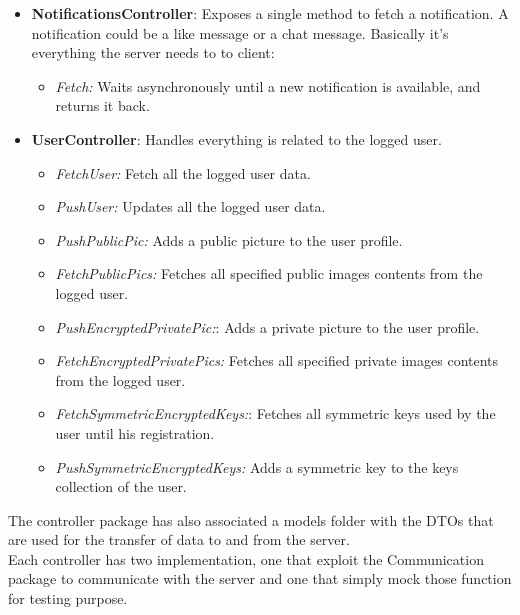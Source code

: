 \documentclass{article}
\begin{document}
\begin{itemize}
\begin{itemize}
	    \end{itemize}
	\item \textbf{NotificationsController}: Exposes a single method to fetch a notification. A notification could be a like message or a chat message. Basically it's everything the server needs to to client:
		\begin{itemize}
				\item \textit{ Fetch:} Waits asynchronously until a new notification is available, and returns it back.
		\end{itemize}
	\item \textbf{UserController}: Handles everything is related to the logged user.
	\begin{itemize}
    	    \item \textit{ FetchUser:} Fetch all the logged user data.
	        \item \textit{ PushUser:} Updates all the logged user data.
	        \item \textit{ PushPublicPic:} Adds a public picture to the user profile.
	        \item \textit{ FetchPublicPics:} Fetches all specified public images contents from the logged user.
	        \item \textit{ PushEncryptedPrivatePic:}: Adds a private picture to the user profile.
	        \item \textit{ FetchEncryptedPrivatePics:} Fetches all specified private images contents from the logged user.
	        \item \textit{ FetchSymmetricEncryptedKeys:}: Fetches all symmetric keys used by the user until his registration.
	        \item \textit{ PushSymmetricEncryptedKeys:} Adds a symmetric key to the keys collection of the user.
	\end{itemize}
	
\end{itemize}
The controller package has also associated a models folder with the DTOs that are used for the transfer of data to and from the server. \\
Each controller has two implementation, one that exploit the Communication package to communicate with the server and one that simply mock those function for testing purpose. 
\end{document}
